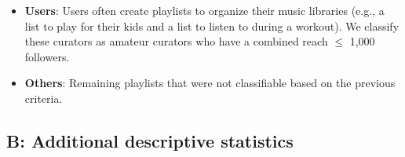 \begin{itemize}
     \item \textbf{Users}: Users often create playlists to organize their music libraries (e.g., a list to play for their kids and a list to listen to during a workout). We classify these curators as amateur curators who have a combined reach $\leq$ 1,000 followers.
     
     \item \textbf{Others}: Remaining playlists that were not classifiable based on the previous criteria.
    
\end{itemize}

\subsection*{B: Additional descriptive statistics}
\label{summary_final_sample}

\setcounter{figure}{0}

\setcounter{table}{0}


\renewcommand\thefigure{B\arabic{figure}}
\renewcommand\thetable{B\arabic{table}}










    
